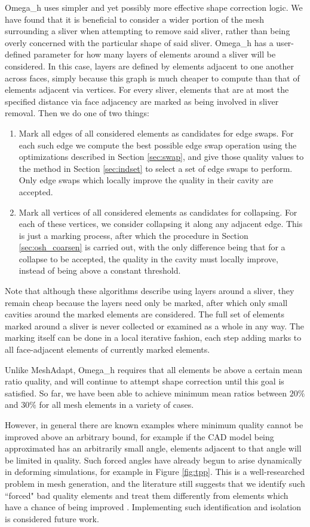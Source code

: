 Omega\_h uses simpler and yet possibly more effective shape correction logic.
We have found that it is beneficial to consider a wider portion of the
mesh surrounding a sliver when attempting to remove said sliver, rather
than being overly concerned with the particular shape of said sliver.
Omega\_h has a user-defined parameter for how many layers of elements
around a sliver will be considered.
In this case, layers are defined by elements adjacent to one another
across faces, simply because this graph is much cheaper to compute
than that of elements adjacent via vertices.
For every sliver, elements that are at most the specified distance
via face adjacency are marked as being involved in sliver removal.
Then we do one of two things:
\begin{enumerate}
\item Mark all edges of all considered elements as candidates for edge swaps.
For each such edge we compute the best possible edge swap operation
using the optimizations described in Section \ref{sec:swap},
and give those quality values to the method in Section \ref{sec:indset} to
select a set of edge swaps to perform.
Only edge swaps which locally improve the quality in their cavity are accepted.
\item Mark all vertices of all considered elements as candidates for collapsing.
For each of these vertices, we consider collapsing it along any adjacent edge.
This is just a marking process, after which the procedure in Section \ref{sec:osh_coarsen}
is carried out, with the only difference being that for a collapse to be accepted,
the quality in the cavity must locally improve, instead of being above a
constant threshold.
\end{enumerate}
Note that although these algorithms describe using layers around a sliver,
they remain cheap because the layers need only be marked, after which only
small cavities around the marked elements are considered.
The full set of elements marked around a sliver is never collected or examined
as a whole in any way.
The marking itself can be done in a local iterative fashion, each step adding
marks to all face-adjacent elements of currently marked elements.

Unlike MeshAdapt, Omega\_h requires that all elements be above a certain
mean ratio quality, and will continue to attempt shape correction until
this goal is satisfied.
So far, we have been able to achieve minimum mean ratios between $20\%$
and $30\%$ for all mesh elements in a variety of cases.

However, in general there are known examples where minimum quality cannot be improved
above an arbitrary bound, for example if the CAD model being approximated has
an arbitrarily small angle, elements adjacent to that angle will be limited
in quality.
Such forced angles have already begun to arise dynamically in
deforming simulations, for example in Figure \ref{fig:tpp}.
This is a well-researched problem in mesh generation, and the literature
still suggests that we identify such ``forced" bad quality elements and treat them
differently from elements which have a chance of being improved \cite{engwirda2016conforming}.
Implementing such identification and isolation is considered future work.

